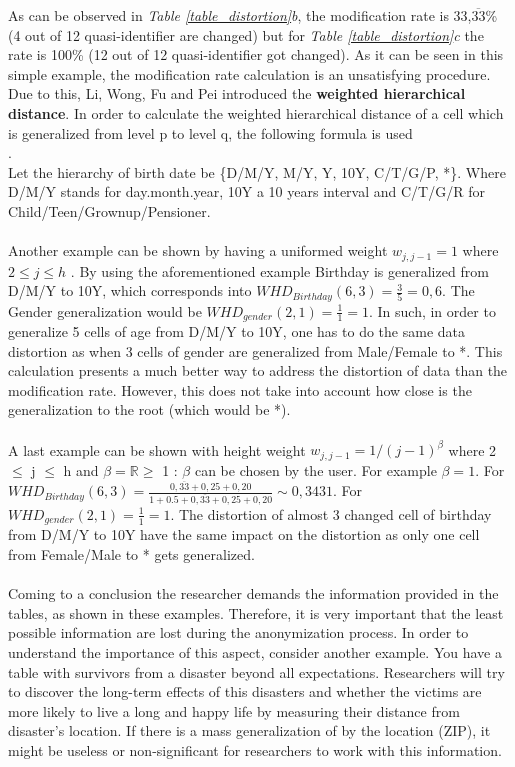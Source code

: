 \documentclass{llncs}
\newcommand{\R}{\mathbb{R}}
\begin{document}
As can be observed in \textit{Table \ref{table_distortion}b}, the modification rate is  33,$\overline{33}$\% (4 out of 12 quasi-identifier are changed) but for \textit{Table \ref{table_distortion}c} the rate is 100\% (12 out of 12 quasi-identifier got changed). As it can be seen in this simple example, the modification rate calculation is an unsatisfying procedure. Due to this, Li, Wong, Fu and Pei introduced the \textbf{weighted hierarchical distance}. In order to calculate the weighted hierarchical distance of a cell which is generalized from level p to level q, the following formula is used\\
\cite{li2006achieving}.\\
Let the hierarchy of birth date be \{D/M/Y, M/Y, Y, 10Y, C/T/G/P, *\}. Where D/M/Y  stands for day.month.year, 10Y a 10 years interval and C/T/G/R for Child/Teen/Grownup/Pensioner.
\\\\
Another example can be shown by having a uniformed weight $w_{j,j-1} = 1$ where $2\leq j \leq h$ \cite{li2006achieving}. By using the aforementioned example Birthday is generalized from D/M/Y to 10Y, which corresponds into $WHD_{Birthday}(6,3) = \frac{3}{5} = 0,6$. 
The Gender generalization would be $WHD_{gender}(2,1) = \frac{1}{1} = 1$. In such, in order to generalize 5 cells of age from D/M/Y to 10Y, one has to do the same data distortion as when 3 cells of gender are generalized from Male/Female to *. This calculation presents a much better way to address the distortion of data than the modification rate. However, this does not take into account how close is the generalization to the root (which would be *).\\\\
A last example can be shown with height weight $w_{j,j-1} = 1 / (j-1)^{\beta}$ where 2 $\leq$ j $\leq$ h and $\beta = \R \geq$ 1 \cite{li2006achieving}:
$\beta$ can be chosen by the user. For example $\beta = 1$. For $WHD_{Birthday}(6,3) = \frac{0,\overline{33}+0,25+0,20}{1+0.5+0,\overline{33}+0,25+0,20} \sim 0,3431$. For $WHD_{gender}(2,1) = \frac{1}{1} = 1$. The distortion of almost 3 changed cell of birthday from D/M/Y to 10Y have the same impact on the distortion as only one cell from Female/Male to * gets generalized.\\\\
Coming to a conclusion the researcher demands the information provided in the tables, as shown in these examples. Therefore, it is very important that the least possible information are lost during the anonymization process. In order to understand the importance of this aspect, consider another example. You have a table with survivors from a disaster beyond all expectations. Researchers will try to discover the long-term effects of this disasters and whether the victims are more likely to live a long and happy life by measuring their distance from disaster’s location. If there is a mass generalization of by the location (ZIP), it might be useless or non-significant for researchers to work with this information.
\end{document}

